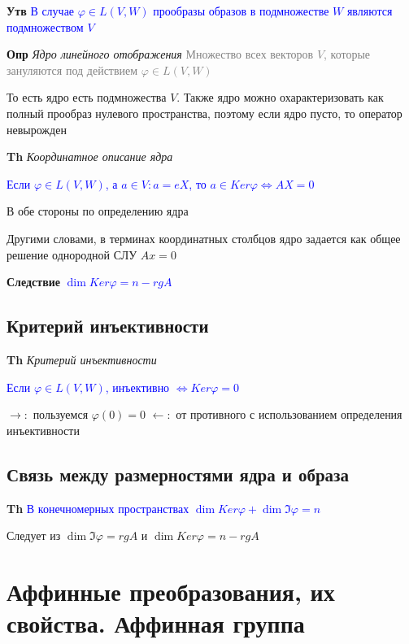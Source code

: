 \documentclass[a4paper, 14pt]{article}
\begin{document}
    \textbf{Утв} \textcolor{blue}{В случае $\varphi \in L(V, W)$ прообразы образов в подмножестве $W$ являются
    подмножеством $V$}

    \textbf{Опр} \textit{Ядро линейного отображения} \textcolor{gray}{Множество всех векторов $V$, которые зануляются
    под действием $\varphi \in L(V, W)$}

    То есть ядро есть подмножества $V$.
    Также ядро можно охарактеризовать как полный прообраз нулевого пространства, поэтому если ядро пусто, то
    оператор невырожден

    \textbf{Th} \textit{Координатное описание ядра}

    \textcolor{blue}{Если $\varphi \in L(V, W)$, а $a \in V: a = eX$, то $a \in Ker \varphi \Leftrightarrow AX = 0$}

    В обе стороны по определению ядра

    Другими словами, в терминах координатных столбцов ядро задается как общее решение однородной СЛУ $Ax = 0$

    \textbf{Следствие} \textcolor{blue}{$\dim Ker \varphi = n - rg A$}

    \subsection{Критерий инъективности}

    \textbf{Th} \textit{Критерий инъективности}

    \textcolor{blue}{Если $\varphi \in L(V, W)$, инъективно
        $\Leftrightarrow Ker \varphi = 0$}

    $\rightarrow:$ пользуемся $\varphi(0) = 0$
    $\leftarrow:$ от противного с использованием определения инъективности

    \subsection{Связь между размерностями ядра и образа}

    \textbf{Th} \textcolor{blue}{В конечномерных пространствах $\dim Ker \varphi + \dim \Im \varphi = n$}

    Следует из $\dim \Im \varphi = rg A$ и $\dim Ker \varphi = n - rg A$

    \section{Аффинные преобразования, их свойства.
    Аффинная группа}
\end{document}
